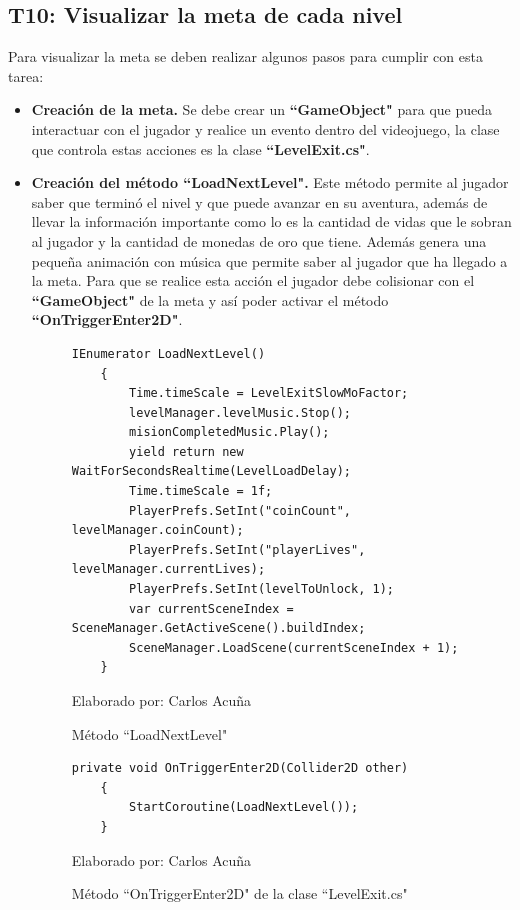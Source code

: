 \documentclass[a4paper, openright, 12pt]{report}
\begin{document}
\subsection*{T10: Visualizar la meta de cada nivel}
\justify
Para visualizar la meta se deben realizar algunos pasos para cumplir con esta tarea:
\begin{itemize}
\item \textbf{Creación de la meta.} Se debe crear un \textbf{``GameObject"} para que pueda interactuar con el jugador y realice un evento dentro del videojuego, la clase que controla estas acciones es la clase \textbf{``LevelExit.cs"}.

\item \textbf{Creación del método ``LoadNextLevel".} Este método permite al jugador saber que terminó el nivel y que puede avanzar en su aventura, además de llevar la información importante como lo es la cantidad de vidas que le sobran al jugador y la cantidad de monedas de oro que tiene. Además genera una pequeña animación con música que permite saber al jugador que ha llegado a la meta. Para que se realice esta acción el jugador debe colisionar con el \textbf{``GameObject"} de la meta y así poder activar el método \textbf{``OnTriggerEnter2D"}.

\begin{figure}[h]
\captionsetup{justification=centering,margin=2cm}
\centering
\lstset{language=C, breaklines=true, basicstyle=\footnotesize}
\lstset{numbers=left, numberstyle=\tiny, stepnumber=1, numbersep=-2pt}
\captionsetup{justification=centering,margin=2cm}
\begin{lstlisting}[frame=single]
    IEnumerator LoadNextLevel()
    {
        Time.timeScale = LevelExitSlowMoFactor;
        levelManager.levelMusic.Stop();
        misionCompletedMusic.Play();
        yield return new WaitForSecondsRealtime(LevelLoadDelay);
        Time.timeScale = 1f;
        PlayerPrefs.SetInt("coinCount", levelManager.coinCount);
        PlayerPrefs.SetInt("playerLives", levelManager.currentLives);
        PlayerPrefs.SetInt(levelToUnlock, 1);
        var currentSceneIndex = SceneManager.GetActiveScene().buildIndex;
        SceneManager.LoadScene(currentSceneIndex + 1);
    }
\end{lstlisting}
\caption{Método ``LoadNextLevel"}
Elaborado por: Carlos Acuña
\end{figure}

\begin{figure}[h]
\lstset{language=C, breaklines=true, basicstyle=\footnotesize}
\lstset{numbers=left, numberstyle=\tiny, stepnumber=1, numbersep=-2pt}
\captionsetup{justification=centering,margin=2cm}
\centering
\begin{lstlisting}[frame=single]
    private void OnTriggerEnter2D(Collider2D other)
    {
        StartCoroutine(LoadNextLevel());
    }
\end{lstlisting}
\caption{Método ``OnTriggerEnter2D" de la clase ``LevelExit.cs"}
Elaborado por: Carlos Acuña
\end{figure}
\end{itemize}
\end{document}
